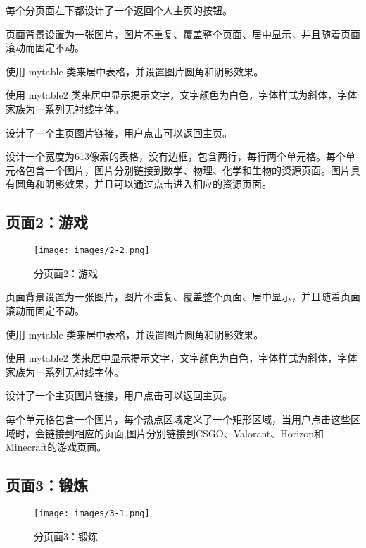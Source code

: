 \documentclass[supercite]{Experimental_Report}
\theoremstyle{definition}
\begin{document}
每个分页面左下都设计了一个返回个人主页的按钮。

页面背景设置为一张图片，图片不重复、覆盖整个页面、居中显示，并且随着页面滚动而固定不动。

使用  mytable  类来居中表格，并设置图片圆角和阴影效果。

使用  mytable2  类来居中显示提示文字，文字颜色为白色，字体样式为斜体，字体家族为一系列无衬线字体。

设计了一个主页图片链接，用户点击可以返回主页。

设计一个宽度为613像素的表格，没有边框，包含两行，每行两个单元格。每个单元格包含一个图片，图片分别链接到数学、物理、化学和生物的资源页面。图片具有圆角和阴影效果，并且可以通过点击进入相应的资源页面。
\newpage
\subsection{页面2：游戏}

\begin{figure}[htb]
	\begin{center}
		\texttt{[image: images/2-2.png]}
		\caption{分页面2：游戏}
		\label{fig2-2}
	\end{center}
\end{figure}

页面背景设置为一张图片，图片不重复、覆盖整个页面、居中显示，并且随着页面滚动而固定不动。

使用  mytable  类来居中表格，并设置图片圆角和阴影效果。

使用  mytable2  类来居中显示提示文字，文字颜色为白色，字体样式为斜体，字体家族为一系列无衬线字体。

设计了一个主页图片链接，用户点击可以返回主页。

每个单元格包含一个图片，每个热点区域定义了一个矩形区域，当用户点击这些区域时，会链接到相应的页面,图片分别链接到CSGO、Valorant、Horizon和Minecraft的游戏页面。



\newpage
\subsection{页面3：锻炼}

\begin{figure}[htb]
	\begin{center}
		\texttt{[image: images/3-1.png]}
		\caption{分页面3：锻炼}
		\label{fig3-1}
	\end{center}
\end{figure}
\end{document}
